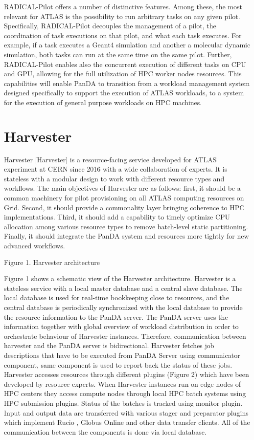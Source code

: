 \documentclass{webofc}
\begin{document}
RADICAL-Pilot offers a number of distinctive features. Among these, the most relevant for ATLAS is the possibility to run arbitrary tasks on any given pilot. Specifically, RADICAL-Pilot decouples the management of a pilot, the coordination of task executions on that pilot, and what each task executes. For example, if a task executes a Geant4 simulation and another a molecular dynamic simulation, both tasks can run at the same time on the same pilot. Further, RADICAL-Pilot enables also the concurrent execution of different tasks on CPU and GPU, allowing for the full utilization of HPC worker nodes resources. This capabilities will enable PanDA to transition from a workload management system designed specifically to support the execution of ATLAS workloads, to a system for the execution of general purpose workloads on HPC machines.

\section{Harvester}

Harvester [Harvester] is a resource-facing service developed for ATLAS experiment at CERN since 2016 with a wide collaboration of experts.  It is stateless with a modular design to work with different resource types and workflows. The main objectives of Harvester are as follows: first, it should be a common machinery for pilot provisioning on all ATLAS computing resources on Grid. Second, it should provide a commonality layer bringing coherence to HPC implementations. Third, it should add a capability to timely optimize CPU allocation among various resource types to remove batch-level static partitioning. Finally, it should integrate the PanDA system and resources more tightly for new advanced workflows.

Figure 1. Harvester architecture

Figure 1 shows a schematic view of the Harvester architecture. Harvester is a stateless service with a local master database and a central slave database. The local database is used for real-time bookkeeping close to resources, and the central database is periodically synchronized with the local database to provide the resource information to the PanDA server. The PanDA server uses the information together with global overview of workload distribution in order to orchestrate behaviour of Harvester instances. Therefore, communication between harvester and the PanDA server is bidirectional. Harvester fetches job descriptions that have to be executed from PanDA Server using communicator component, same component is used to report back the status of these jobs. Harvester accesses resources through different plugins (Figure 2) which have been developed by resource experts. When Harvester instances run on edge nodes of HPC centers they access compute nodes through local HPC batch systems using HPC submission plugins. Status of the batches is tracked using monitor plugin. Input and output data are transferred with various stager and preparator plugins which implement Rucio \cite{RUCIO}, Globus Online \cite{Globus_online}  and other data transfer clients. All of the communication between the components is done via local database.
\end{document}
